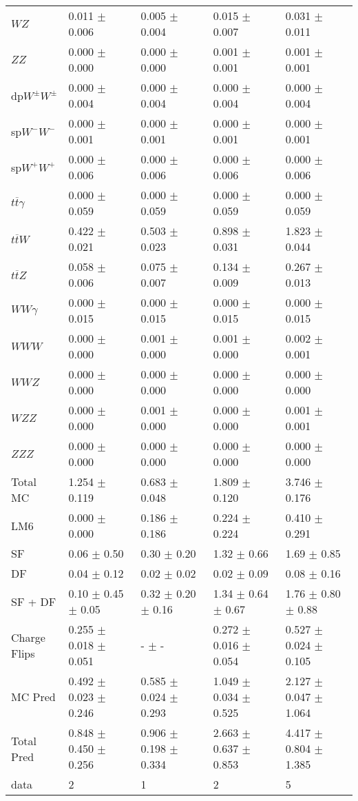\begin{tabular}{l | l l l l}
$WZ$ &  0.011 $\pm$  0.006 &  0.005 $\pm$  0.004 &  0.015 $\pm$  0.007 &  0.031 $\pm$  0.011\\
$ZZ$ &   0.000 $\pm$   0.000 &   0.000 $\pm$   0.000 &  0.001 $\pm$  0.001 &  0.001 $\pm$  0.001\\
\hline
dp$W^{\pm}W^{\pm}$ &  0.000 $\pm$  0.004 &  0.000 $\pm$  0.004 &  0.000 $\pm$  0.004 &  0.000 $\pm$  0.004\\
sp$W^{-}W^{-}$ &  0.000 $\pm$  0.001 &  0.000 $\pm$  0.001 &  0.000 $\pm$  0.001 &  0.000 $\pm$  0.001\\
sp$W^{+}W^{+}$ &  0.000 $\pm$  0.006 &  0.000 $\pm$  0.006 &  0.000 $\pm$  0.006 &  0.000 $\pm$  0.006\\
$t\overline{t}\gamma$ &  0.000 $\pm$  0.059 &  0.000 $\pm$  0.059 &  0.000 $\pm$  0.059 &  0.000 $\pm$  0.059\\
$t\overline{t}W$ &  0.422 $\pm$  0.021 &  0.503 $\pm$  0.023 &  0.898 $\pm$  0.031 &  1.823 $\pm$  0.044\\
$t\overline{t}Z$ &  0.058 $\pm$  0.006 &  0.075 $\pm$  0.007 &  0.134 $\pm$  0.009 &  0.267 $\pm$  0.013\\
$WW\gamma$ &  0.000 $\pm$  0.015 &  0.000 $\pm$  0.015 &  0.000 $\pm$  0.015 &  0.000 $\pm$  0.015\\
$WWW$ &   0.000 $\pm$   0.000 &  0.001 $\pm$   0.000 &  0.001 $\pm$   0.000 &  0.002 $\pm$  0.001\\
$WWZ$ &   0.000 $\pm$   0.000 &   0.000 $\pm$   0.000 &  0.000 $\pm$   0.000 &   0.000 $\pm$   0.000\\
$WZZ$ &   0.000 $\pm$   0.000 &  0.001 $\pm$   0.000 &   0.000 $\pm$   0.000 &  0.001 $\pm$  0.001\\
$ZZZ$ &   0.000 $\pm$   0.000 &   0.000 $\pm$   0.000 &   0.000 $\pm$   0.000 &   0.000 $\pm$   0.000\\
\hline
Total MC &  1.254 $\pm$  0.119 &  0.683 $\pm$  0.048 &  1.809 $\pm$  0.120 &  3.746 $\pm$  0.176\\
\hline\hline
\hline
LM6 &  0.000 $\pm$  0.000 &  0.186 $\pm$  0.186 &  0.224 $\pm$  0.224 &  0.410 $\pm$  0.291\\
\hline\hline
\hline\hline
 SF  & 0.06 $\pm$ 0.50 & 0.30 $\pm$ 0.20 & 1.32 $\pm$ 0.66 & 1.69 $\pm$ 0.85\\
 DF  & 0.04 $\pm$ 0.12 & 0.02 $\pm$ 0.02 & 0.02 $\pm$ 0.09 & 0.08 $\pm$ 0.16\\
\hline
 SF + DF  & 0.10 $\pm$ 0.45 $\pm$ 0.05 & 0.32 $\pm$ 0.20 $\pm$ 0.16 & 1.34 $\pm$ 0.64 $\pm$ 0.67 & 1.76 $\pm$ 0.80 $\pm$ 0.88\\
\hline\hline
Charge Flips & 0.255 $\pm$ 0.018 $\pm$ 0.051 & - $\pm$ - & 0.272 $\pm$ 0.016 $\pm$ 0.054 & 0.527 $\pm$ 0.024 $\pm$ 0.105\\
\hline\hline
\hline
MC Pred &  0.492 $\pm$  0.023 $\pm$  0.246 &  0.585 $\pm$  0.024 $\pm$  0.293 &  1.049 $\pm$  0.034 $\pm$  0.525 &  2.127 $\pm$  0.047 $\pm$  1.064\\
\hline\hline
Total Pred &  0.848 $\pm$  0.450 $\pm$  0.256 &  0.906 $\pm$  0.198 $\pm$  0.334 &  2.663 $\pm$  0.637 $\pm$  0.853 &  4.417 $\pm$  0.804 $\pm$  1.385\\
\hline\hline
data & 2 & 1 & 2 & 5\\
\hline\hline
\end{tabular}

